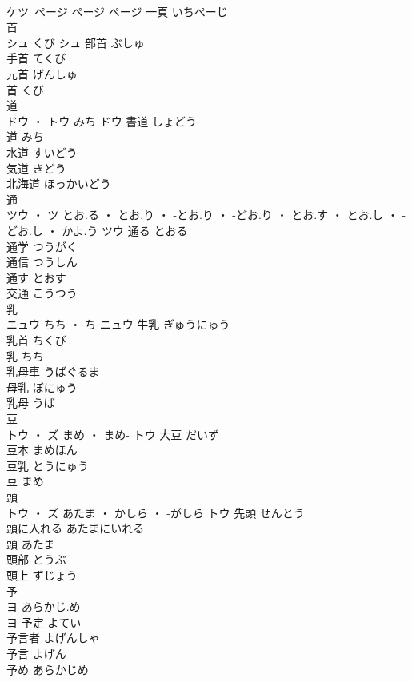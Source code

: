 \documentclass[8pt]{extreport}
\begin{document}
\begin{CJK}{UTF8}{min}
\\	ケツ ページ	ページ	ページ													一頁	いちぺーじ	
\\	首	
\\	シュ	くび	シュ	部首	ぶしゅ	
\\	手首	てくび	
\\	元首	げんしゅ	
\\	首	くび	
\\	道	
\\	ドウ ・ トウ	みち	ドウ	書道	しょどう	
\\	道	みち	
\\	水道	すいどう	
\\	気道	きどう	
\\	北海道	ほっかいどう	
\\	通	
\\	ツウ ・ ツ	とお.る ・ とお.り ・ -とお.り ・ -どお.り ・ とお.す ・ とお.し ・ -どお.し ・ かよ.う	ツウ	通る	とおる	
\\	通学	つうがく	
\\	通信	つうしん	
\\	通す	とおす	
\\	交通	こうつう	
\\	乳	
\\	ニュウ	ちち ・ ち	ニュウ	牛乳	ぎゅうにゅう	
\\	乳首	ちくび	
\\	乳	ちち	
\\	乳母車	うばぐるま	
\\	母乳	ぼにゅう	
\\	乳母	うば	
\\	豆	
\\	トウ ・ ズ	まめ ・ まめ-	トウ	大豆	だいず	
\\	豆本	まめほん	
\\	豆乳	とうにゅう	
\\	豆	まめ	
\\	頭	
\\	トウ ・ ズ	あたま ・ かしら ・ -がしら	トウ	先頭	せんとう	
\\	頭に入れる	あたまにいれる	
\\	頭	あたま	
\\	頭部	とうぶ	
\\	頭上	ずじょう	
\\	予	
\\	ヨ	あらかじ.め
\\	ヨ	予定	よてい	
\\	予言者	よげんしゃ	
\\	予言	よげん	
\\	予め	あらかじめ	

\end{CJK}
\end{document}
